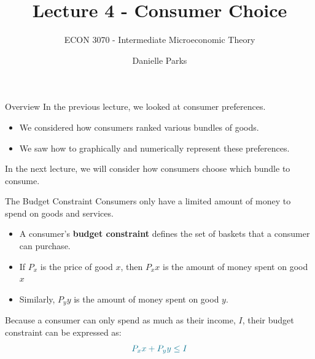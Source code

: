 \documentclass{beamer}
\author{Danielle Parks}
\title{Lecture 4 - Consumer Choice}
\subtitle{ECON 3070 - Intermediate Microeconomic Theory}
\begin{document}
\begin{frame}
  \titlepage
\end{frame}

\begin{frame}{Overview}
  In the previous lecture, we looked at consumer preferences.
  \begin{itemize}
    \item We considered how consumers ranked various bundles of goods.

    \item We saw how to graphically and numerically represent these preferences.
  \end{itemize}

  \bigskip
  In the next lecture, we will consider how consumers choose which bundle to consume.
\end{frame}

\begin{frame}{The Budget Constraint}
  Consumers only have a limited amount of money to spend on goods and services.
  \begin{itemize}
    \item A consumer's \textbf{budget constraint} defines the set of baskets that a consumer can purchase.
    
    \item If $P_x$ is the price of good $x$, then $P_x x$ is the amount of money spent on good $x$
    
    \item Similarly, $P_y y$ is the amount of money spent on good $y$.
  \end{itemize}
  
  \bigskip
  Because a consumer can only spend as much as their income, $I$, their budget constraint can be expressed as:
  $$
    \alice{P_x x + P_y y \leq I}
  $$
\end{frame}
\end{document}
